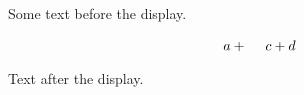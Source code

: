 \documentclass[12pt]{article}
\begin{document}
Some text before the display.
\[ a + \hphantom{bbb} c + \vphantom{\frac{1}{2}} d \]
Text after the display.
\end{document}
